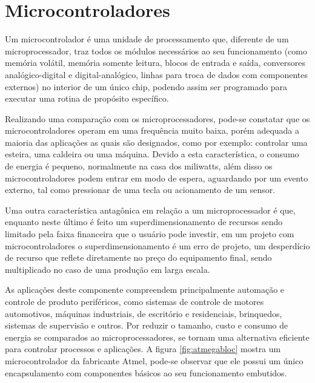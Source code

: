 \newpage
\section{Microcontroladores}

Um microcontrolador é uma unidade de processamento que, diferente de um microprocessador, traz todos os módulos necessários ao seu funcionamento (como memória volátil, memória somente leitura, blocos de entrada e saída, conversores analógico-digital e digital-analógico, linhas para troca de dados com componentes externos) no interior de um único chip, podendo assim ser programado para executar uma rotina de propósito específico.

Realizando uma comparação com os microprocessadores, pode-se constatar que os microcontroladores operam em uma frequência muito baixa, porém adequada a maioria das aplicações as quais são designados, como por exemplo: controlar uma esteira, uma caldeira ou uma máquina. Devido a esta característica, o consumo de energia é pequeno, normalmente na casa dos miliwatts, além disso os microcontroladores podem entrar em modo de espera, aguardando por um evento externo, tal como pressionar de uma tecla ou acionamento de um sensor.

Uma outra característica antagônica em relação a um microprocessador é que, enquanto neste último é feito um superdimensionamento de recursos sendo limitado pela faixa financeira que o usuário pode investir, em um projeto com microcontroladores o superdimensionamento é um erro de projeto, um desperdício de recurso que reflete diretamente no preço do equipamento final, sendo multiplicado no caso de uma produção em larga escala.

As aplicações deste componente compreendem principalmente automação e controle de produto periféricos, como sistemas de controle de motores automotivos, máquinas industriais, de escritório e residenciais, brinquedos, sistemas de supervisão e outros. Por reduzir o tamanho, custo e consumo de energia se comparados ao microprocessadores, se tornam uma alternativa eficiente para controlar processos e aplicações. A figura \ref{fig:atmegabloc} mostra um microcontrolador da fabricante Atmel, pode-se observar que ele possui um único encapsulamento com componentes básicos ao seu funcionamento embutidos.


